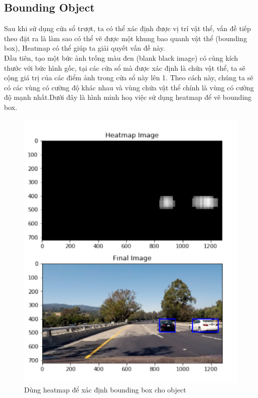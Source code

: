 \documentclass[10pt,conference,a4paper]{IEEEtran}
\makeatletter
\def\ScaleIfNeeded{\ifdim\Gin@nat@width>\linewidth\linewidth\else\Gin@nat@width\fi}
\makeatother
\begin{document}
\subsection{Bounding Object}
Sau khi sử dụng cửa sổ trượt, ta có thể xác định được vị trí vật thể, vấn đề tiếp theo đặt ra là làm sao có thể vẽ được một khung bao quanh vật thể (bounding box), Heatmap có thể giúp ta giải quyết vấn đề này. \\
Đầu tiên, tạo một bức ảnh trống màu đen (blank black image) có cùng kích thước với bức hình gốc, tại các cửa sổ mà được xác định là chứa vật thể, ta sẽ cộng giá trị của các điểm ảnh trong cửa sổ này lên 1. Theo cách này, chúng ta sẽ có các vùng có cường độ khác nhau và vùng chứa vật thể chính là vùng có cường độ mạnh nhất.Dưới đây là hình minh hoạ việc sử dụng heatmap để vẽ bounding box.
\begin{figure}[ht]
	\centering
	\includegraphics[width=\ScaleIfNeeded]{heatmap2}
	\caption{Dùng heatmap để xác định bounding box cho object}
	\label{fig:heatmap2}
\end{figure}
\end{document}
